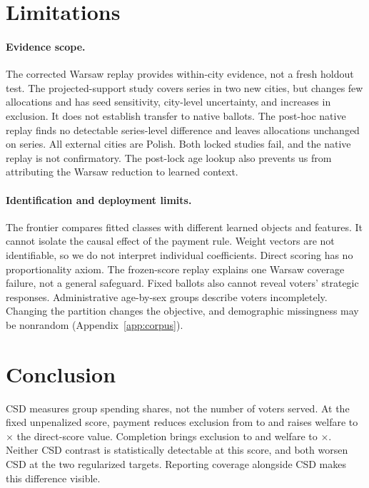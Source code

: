 \documentclass{article}
\begin{document}
\section{Limitations}

\paragraph{Evidence scope.} The corrected Warsaw replay provides within-city
evidence, not a fresh holdout test. The projected-support study covers \ExternalSeriesN{} series in two new
cities, but changes few allocations and has seed sensitivity, city-level
uncertainty, and increases in exclusion. It does not establish transfer to
native ballots. The post-hoc native replay finds no detectable series-level
difference and leaves allocations unchanged on \CrossCityInertN{} series. All external
cities are Polish. Both locked studies fail, and the native replay is not
confirmatory. The post-lock age lookup also prevents us from attributing the
Warsaw reduction to learned context.

\paragraph{Identification and deployment limits.} The frontier compares
fitted classes with different learned objects and features. It cannot isolate
the causal effect of the payment rule. Weight vectors are not identifiable,
so we do not interpret individual coefficients. Direct scoring has no
proportionality axiom. The frozen-score replay explains one Warsaw coverage
failure, not a general safeguard. Fixed ballots also cannot reveal voters'
strategic responses. Administrative age-by-sex groups describe voters
incompletely. Changing the partition changes the objective, and demographic
missingness may be nonrandom
(Appendix~\ref{app:corpus}).

\section{Conclusion}

CSD measures group spending shares, not the number of voters served.
At the fixed unpenalized score, payment reduces exclusion
from \KernelDirectExcl{} to \KernelPaymentOnlyExcl{} and raises welfare to
\KernelPaymentOnlyWelfareFactor$\times$ the direct-score value. Completion
brings exclusion to \KernelPaymentCompleteExcl{} and welfare to
\KernelPaymentCompleteWelfareFactor$\times$. Neither CSD contrast is
statistically detectable at this score, and both worsen CSD at the two
regularized targets. Reporting coverage alongside CSD makes this difference visible.
\end{document}
